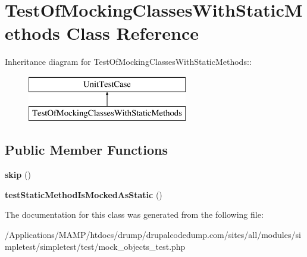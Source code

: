 \hypertarget{class_test_of_mocking_classes_with_static_methods}{
\section{TestOfMockingClassesWithStaticMethods Class Reference}
\label{class_test_of_mocking_classes_with_static_methods}
}
Inheritance diagram for TestOfMockingClassesWithStaticMethods::\begin{figure}[H]
\begin{center}
\leavevmode
\includegraphics[height=2cm]{class_test_of_mocking_classes_with_static_methods}
\end{center}
\end{figure}
\subsection*{Public Member Functions}
\begin{DoxyCompactItemize}
\item 
\hypertarget{class_test_of_mocking_classes_with_static_methods_a52082a99dc3114a3d03c5d9a4bfea6ad}{
{\bfseries skip} ()}
\label{class_test_of_mocking_classes_with_static_methods_a52082a99dc3114a3d03c5d9a4bfea6ad}

\item 
\hypertarget{class_test_of_mocking_classes_with_static_methods_ab10b27b151755547ffc8269aad773906}{
{\bfseries testStaticMethodIsMockedAsStatic} ()}
\label{class_test_of_mocking_classes_with_static_methods_ab10b27b151755547ffc8269aad773906}

\end{DoxyCompactItemize}


The documentation for this class was generated from the following file:\begin{DoxyCompactItemize}
\item 
/Applications/MAMP/htdocs/drump/drupalcodedump.com/sites/all/modules/simpletest/simpletest/test/mock\_\-objects\_\-test.php\end{DoxyCompactItemize}
